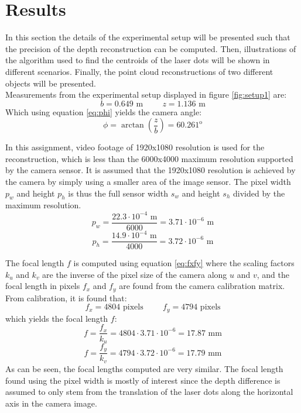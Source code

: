 \newpage
\section{Results}
\label{sec:results}
In this section the details of the experimental setup will be presented such that the precision of the depth reconstruction can be computed. Then, illustrations of the algorithm used to find the centroids of the laser dots will be shown in different scenarios. Finally, the point cloud reconstructions of two different objects will be presented.\\

Measurements from the experimental setup displayed in figure \ref{fig:setup1} are:
\begin{equation}
    b = 0.649 \text{ m} \hspace{1cm} z = 1.136 \text{ m}
\end{equation}
Which using equation \ref{eq:phi} yields the camera angle:
\begin{equation}
    \phi = \arctan{\left(\frac{z}{b}\right)} = 60.261^{\text{o}}
\end{equation}
 
In this assignment, video footage of 1920x1080 resolution is used for the reconstruction, which is less than the 6000x4000 maximum resolution supported by the camera sensor. It is assumed that the 1920x1080 resolution is achieved by the camera by simply using a smaller area of the image sensor. The pixel width $p_{w}$ and height $p_{h}$ is thus the full sensor width $s_{w}$ and height $s_{h}$ divided by the maximum resolution.
\begin{equation}
        p_{w} = \frac{22.3 \cdot 10^{-4} \text{ m}}{6000} = 3.71 \cdot 10^{-6} \text{ m}
\end{equation}
\begin{equation}
    p_{h} = \frac{14.9 \cdot 10^{-4} \text{ m}}{4000} = 3.72 \cdot 10^{-6} \text{ m}
\end{equation}

The focal length $f$ is computed using equation \ref{eq:fxfy} where the scaling factors $k_{u}$ and $k_{v}$ are the inverse of the pixel size of the camera along $u$ and $v$, and the focal length in pixels $f_{x}$ and $f_{y}$ are found from the camera calibration matrix. From calibration, it is found that:
\begin{equation}
    f_{x} = 4804 \text{ pixels} \hspace{1cm} f_{y} = 4794 \text{ pixels}
\end{equation}
which yields the focal length $f$:
\begin{equation}
    f = \frac{f_{x}}{k_{u}} = 4804 \cdot 3.71 \cdot 10^{-6} = 17.87 \text{ mm}
\end{equation}
\begin{equation}
    f = \frac{f_{y}}{k_{v}} = 4794 \cdot 3.72 \cdot 10^{-6} = 17.79 \text{ mm}
\end{equation}
As can be seen, the focal lengths computed are very similar. The focal length found using the pixel width is mostly of interest since the depth difference is assumed to only stem from the translation of the laser dots along the horizontal axis in the camera image.\\

